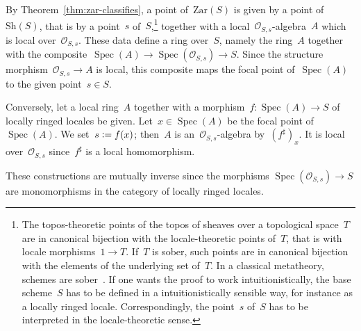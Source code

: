 \documentclass[10pt,reqno,a4paper]{amsbook}
\makeatletter
\theoremstyle{definition}
\theoremstyle{plain}
\theoremstyle{remark}
\renewcommand{\O}{\mathcal{O}}
\newcommand{\Sh}{\mathrm{Sh}}
\newcommand{\Zar}{\mathrm{Zar}}
\DeclareMathOperator{\Spec}{Spec}
\newcommand{\?}{\,{:}\,}
\renewcommand{\_}{\mathpunct{.}\,}
\newcommand{\stacksproject}[1]{\cite[{\href{https://stacks.math.columbia.edu/tag/#1}{Tag~#1}}]{stacks-project}}
\newcommand{\defeq}{\vcentcolon=}
\renewenvironment{proof}[1][\proofname]{\par
  \pushQED{\qed}%
  \normalfont \topsep6\p@\@plus6\p@\relax
  \trivlist
  \item[\hskip\labelsep
        \itshape
    #1\@addpunct{.}]\ignorespaces
}{%
  \popQED\endtrivlist\@endpefalse
}
\makeatother
\begin{document}
\begin{proof}By Theorem~\ref{thm:zar-classifies}, a point of~$\Zar(S)$ is given
by a point of~$\Sh(S)$, that is by a point~$s$ of~$S$,\footnote{The
topos-theoretic points of the topos of sheaves over a topological space~$T$ are
in canonical bijection with the locale-theoretic points of~$T$, that is with
locale morphisms~$1 \to T$. If~$T$ is sober, such points are in canonical
bijection with the elements of the underlying set of~$T$. In a classical
metatheory, schemes are sober~\stacksproject{01IS}. If one wants the proof to
work intuitionistically, the base scheme~$S$ has to be defined in a
intuitionistically sensible way, for instance as a locally ringed locale.
Correspondingly, the point~$s$ of~$S$ has to be interpreted in the
locale-theoretic sense.} together with a local~$\O_{S,s}$-algebra~$A$ which is
local over~$\O_{S,s}$. These data define a ring over~$S$, namely the ring~$A$
together with the composite~$\Spec(A) \to \Spec(\O_{S,s}) \to S$.
Since the structure morphism~$\O_{S,s} \to A$ is local, this composite maps the
focal point of~$\Spec(A)$ to the given point~$s \in S$.

Conversely, let a local ring~$A$ together with a morphism~$f : \Spec(A) \to S$ of
locally ringed locales be given. Let~$x \in \Spec(A)$ be the focal point
of~$\Spec(A)$. We set~$s \defeq f(x)$; then~$A$ is an~$\O_{S,s}$-algebra
by~$(f^\sharp)_x$. It is local over~$\O_{S,s}$ since~$f^\sharp$ is a local
homomorphism.

These constructions are mutually inverse since the morphisms $\Spec(\O_{S,s})
\to S$ are monomorphisms in the category of locally ringed locales.
\end{proof}
\end{document}

